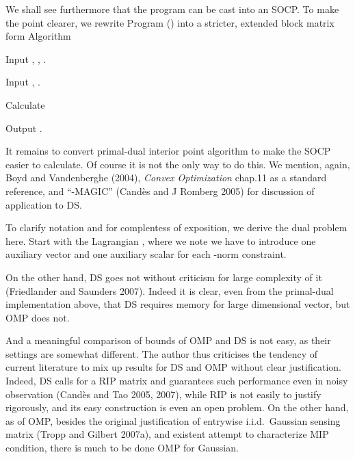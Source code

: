 \stopsubsection

\startsubsection [title={Second Order Cone Problem}]

We shall see furthermore that the program can be cast into an SOCP.
To make the point clearer, we rewrite Program () into a stricter, extended block matrix form
\Result
{Algorithm}
{
\startitemize[n]
\item Input , , .
\item Input , .
\item Calculate
\item Output .
\stopitemize
}

\startsection [title={Primal-Dual Interior Point Algorithm}]

It remains to convert primal-dual interior point algorithm to make the SOCP easier to calculate.
Of course it is not the only way to do this.
We mention, again, Boyd and Vandenberghe (2004), {\it Convex Optimization} chap.11 as a standard reference, and ``-MAGIC'' (Cand\`es and J Romberg 2005) for discussion of application to DS.

To clarify notation and for complentess of exposition, we derive the dual problem here.
Start with the Lagrangian , where we note we have to introduce one auxiliary vector and one auxiliary scalar for each -norm constraint.

%
%

\startsection [title={Discussion}]


On the other hand, DS goes not without criticism for large complexity of it (Friedlander and Saunders 2007).
Indeed it is clear, even from the primal-dual implementation above, that DS requires memory for large dimensional vector, but OMP does not.

And a meaningful comparison of bounds of OMP and DS is not easy, as their settings are somewhat different.
The author thus criticises the tendency of current literature to mix up results for DS and OMP without clear justification.
Indeed, DS calls for a RIP matrix and guarantees such performance even in noisy observation (Cand\`es and Tao 2005, 2007), while RIP is not easily to justify rigorously, and its easy construction is even an open problem.
On the other hand, as of OMP, besides the original justification of entrywise i.i.d.\ Gaussian sensing matrix (Tropp and Gilbert 2007a), and existent attempt to characterize MIP condition, there is much to be done OMP for Gaussian.

\stopchapter
